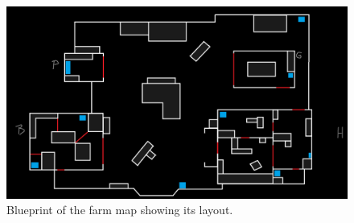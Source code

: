 \documentclass[11pt]{article}
\begin{document}
\begin{figure}[htb] 
    \centering
    \includegraphics[width=\columnwidth]{farm-bp}
    \caption{Blueprint of the farm map showing its layout.}
    \label{fig:farm-bp}
\end{figure}

\clearpage
\end{document}
